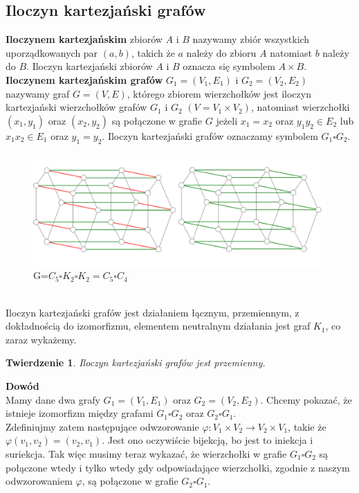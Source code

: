 \documentclass[12pt,a4paper,titlepage]{article}
\newtheorem{twr}{Twierdzenie}
\newcommand\tab[1][1cm]{\hspace*{#1}}
\begin{document}
\subsection{Iloczyn kartezjański grafów}
\textbf{Iloczynem kartezjańskim} zbiorów $A$ i $B$ nazywamy zbiór wszystkich uporządkowanych par $(a,b)$, takich że $a$ należy do zbioru $A$ natomiast $b$ należy do $B$. Iloczyn kartezjański zbiorów $A$ i $B$ oznacza się symbolem $A \times B$.\\
\tab[0.6cm]\textbf{Iloczynem kartezjańskim grafów} $G_1 = (V_1 , E_1 ) $ i $ G_2 =(V_2 , E_2 ) $ nazywamy graf $G = (V, E)$, którego zbiorem wierzchołków jest iloczyn kartezjański wierzchołków grafów $G_1$ i $G_2$ $(V=V_1 \times V_2 )$, natomiast wierzchołki $(x_1, y_1)$ oraz $(x_2, y_2)$ są połączone w grafie $G$ jeżeli $x_1 = x_2$ oraz $y_1 y_2 \in E_2 $ lub $x_1 x_2 \in E_1 $ oraz $y_1 = y_2 $. Iloczyn kartezjański grafów oznaczamy symbolem $G_1 \square G_2$.
\begin{figure}[h]
\centering
\includegraphics[width = 13.8cm]{graf.png}
\caption{G=$C_5 \square K_2 \square K_2 = C_5 \square C_4$}
\end{figure}
\\
\tab[0.6cm]Iloczyn kartezjański grafów jest działaniem łącznym, przemiennym, z dokładnością do izomorfizmu, elementem neutralnym działania jest graf $K_1$, co zaraz wykażemy.
\begin{twr}
Iloczyn kartezjański grafów jest przemienny.
\end{twr}
\tab[-0.6cm]\textbf{Dowód}\\
\tab[0.6cm]Mamy dane dwa grafy $G_1 = (V_1, E_1)$ oraz $G_2=(V_2, E_2)$. Chcemy pokazać, że istnieje izomorfizm między grafami $G_1 \square G_2$ oraz $G_2 \square G_1$.\\
\tab[0.6cm]Zdefiniujmy zatem następujące odwzorowanie $\varphi : V_1 \times V_2 \rightarrow V_2 \times V_1$, takie że $\varphi(v_1,v_2)=(v_2,v_1)$. Jest ono oczywiście bijekcją, bo jest to iniekcja i suriekcja. Tak więc musimy teraz wykazać, że wierzchołki w grafie $G_1 \square G_2$ są połączone wtedy i tylko wtedy gdy odpowiadające wierzchołki, zgodnie z naszym odwzorowaniem $\varphi$, są połączone w grafie $G_2 \square G_1$. \\
\end{document}

